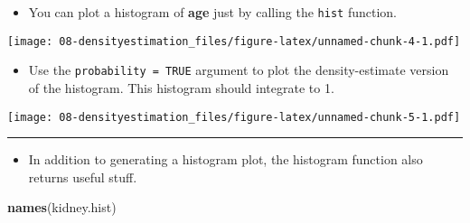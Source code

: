 \documentclass[]{book}
\newenvironment{Shaded}{\begin{snugshade}}{\end{snugshade}}
\newcommand{\DataTypeTok}[1]{\textcolor[rgb]{0.13,0.29,0.53}{#1}}
\newcommand{\KeywordTok}[1]{\textcolor[rgb]{0.13,0.29,0.53}{\textbf{#1}}}
\newcommand{\NormalTok}[1]{#1}
\newcommand{\OperatorTok}[1]{\textcolor[rgb]{0.81,0.36,0.00}{\textbf{#1}}}
\newcommand{\OtherTok}[1]{\textcolor[rgb]{0.56,0.35,0.01}{#1}}
\newcommand{\StringTok}[1]{\textcolor[rgb]{0.31,0.60,0.02}{#1}}
\providecommand{\tightlist}{%
  \setlength{\itemsep}{0pt}\setlength{\parskip}{0pt}}
\begin{document}
\begin{itemize}
\tightlist
\item
  You can plot a histogram of \textbf{age} just by calling the \texttt{hist} function.
\end{itemize}

\begin{Shaded}
\end{Shaded}

\texttt{[image: 08-densityestimation\_files/figure-latex/unnamed-chunk-4-1.pdf]}

\begin{itemize}
\tightlist
\item
  Use the \texttt{probability\ =\ TRUE} argument to plot the density-estimate version of the histogram.
  This histogram should integrate to 1.
\end{itemize}

\begin{Shaded}
\end{Shaded}

\texttt{[image: 08-densityestimation\_files/figure-latex/unnamed-chunk-5-1.pdf]}

\begin{center}\rule{0.5\linewidth}{\linethickness}\end{center}

\begin{itemize}
\tightlist
\item
  In addition to generating a histogram plot, the histogram function
  also returns useful stuff.
\end{itemize}

\begin{Shaded}
\begin{Highlighting}[]
\KeywordTok{names}\NormalTok{(kidney.hist)}
\end{Highlighting}
\end{Shaded}
\end{document}
